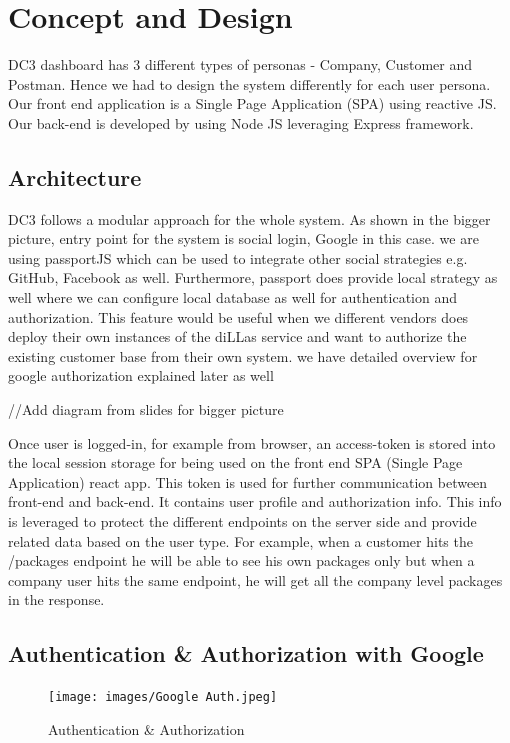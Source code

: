 \chapter{Concept and Design}
\label{cha:conceptanddesign}

DC3 dashboard has 3 different types of personas - Company, Customer and Postman. Hence we had to design the system differently for each user persona. Our front end application is a Single Page Application (SPA) using reactive JS. Our back-end is developed by using Node JS leveraging Express framework. 

\section{Architecture}
DC3 follows a modular approach for the whole system. As shown in the bigger picture, entry point for the system is social login, Google in this case. we are using passportJS which can be used to integrate other social strategies e.g. GitHub, Facebook as well. Furthermore, passport does provide local strategy as well where we can configure local database as well for authentication and authorization. This feature would be useful when we different vendors does deploy their own instances of the diLLas service and want to authorize the existing customer base from their own system. we have detailed overview for google authorization explained later as well 

//Add diagram from slides for bigger picture

Once user is logged-in, for example from browser, an access-token is stored into the local session storage for being used on the front end SPA (Single Page Application) react app.  This token is used for further communication between front-end and back-end. It contains user profile and authorization info. This info is leveraged to protect the different endpoints on the server side and provide related data based on the user type. For example, when a customer hits the /packages endpoint he will be able to see his own packages only but when a company user hits the same endpoint, he will get all the company level packages in the response.

\section{Authentication \& Authorization with Google}
\begin{figure}[!ht]
	\centering
	\texttt{[image: images/Google Auth.jpeg]}\\
	\caption{Authentication \& Authorization}
	\label{fig:Authentication and Authorization}
\end{figure}


